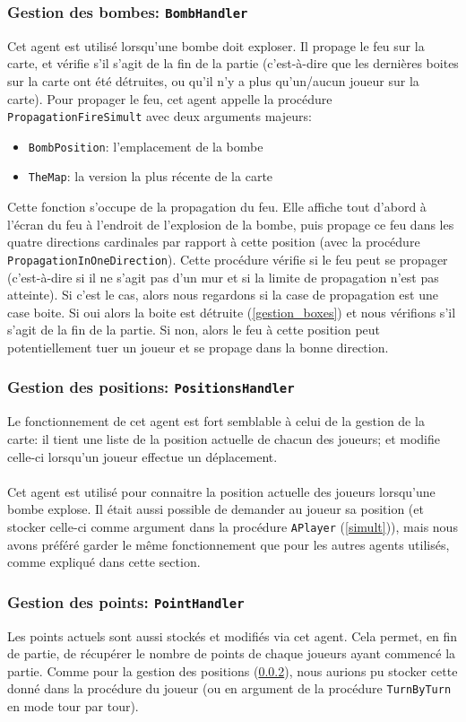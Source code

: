 \documentclass{article}
\begin{document}
\subsubsection{Gestion des bombes: \texttt{BombHandler}}
\label{gestion_bombes}
Cet agent est utilisé lorsqu'une bombe doit exploser. Il propage le feu sur la carte, et vérifie s'il s'agit de la fin de la partie (c'est-à-dire que les dernières boites sur la carte ont été détruites, ou qu'il n'y a plus qu'un/aucun joueur sur la carte). Pour propager le feu, cet agent appelle la procédure \texttt{PropagationFireSimult} avec deux arguments majeurs: 
\begin{itemize}
	\item \texttt{BombPosition}: l'emplacement de la bombe
	\item \texttt{TheMap}: la version la plus récente de la carte
\end{itemize}
Cette fonction s'occupe de la propagation du feu. Elle affiche tout d'abord à l'écran du feu à l'endroit de l'explosion de la bombe, puis propage ce feu dans les quatre directions cardinales par rapport à cette position (avec la procédure \texttt{PropagationInOneDirection}). Cette procédure vérifie si le feu peut se propager (c'est-à-dire si il ne s'agit pas d'un mur et si la limite de propagation n'est pas atteinte). Si c'est le cas, alors nous regardons si la case de propagation est une case boite. Si oui alors la boite est détruite (\ref{gestion_boxes}) et nous vérifions s'il s'agit de la fin de la partie. Si non, alors le feu à cette position peut potentiellement tuer un joueur et se propage dans la bonne direction.
\subsubsection{Gestion des positions: \texttt{PositionsHandler}}
\label{gestion_positions}
Le fonctionnement de cet agent est fort semblable à celui de la gestion de la carte: il tient une liste de la position actuelle de chacun des joueurs; et modifie celle-ci lorsqu'un joueur effectue un déplacement. \\ \\
Cet agent est utilisé pour connaitre la position actuelle des joueurs lorsqu'une bombe explose. Il était aussi possible de demander au joueur sa position (et stocker celle-ci comme argument dans la procédure \texttt{APlayer} (\ref{simult})), mais nous avons préféré garder le même fonctionnement que pour les autres agents utilisés, comme expliqué dans cette section.
\subsubsection{Gestion des points: \texttt{PointHandler}}
\label{gestion_points}
Les points actuels sont aussi stockés et modifiés via cet agent. Cela permet, en fin de partie, de récupérer le nombre de points de chaque joueurs ayant commencé la partie. Comme pour la gestion des positions (\ref{gestion_positions}), nous aurions pu stocker cette donné dans la procédure du joueur (ou en argument de la procédure \texttt{TurnByTurn} en mode tour par tour).
\end{document}
